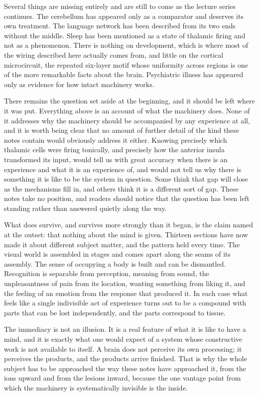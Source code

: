 \documentclass[11pt]{article}
\begin{document}
Several things are missing entirely and are still to come as the lecture series continues. The cerebellum has appeared only as a comparator and deserves its own treatment. The language network has been described from its two ends without the middle. Sleep has been mentioned as a state of thalamic firing and not as a phenomenon. There is nothing on development, which is where most of the wiring described here actually comes from, and little on the cortical microcircuit, the repeated six-layer motif whose uniformity across regions is one of the more remarkable facts about the brain. Psychiatric illness has appeared only as evidence for how intact machinery works.

There remains the question set aside at the beginning, and it should be left where it was put. Everything above is an account of what the machinery does. None of it addresses why the machinery should be accompanied by any experience at all, and it is worth being clear that no amount of further detail of the kind these notes contain would obviously address it either. Knowing precisely which thalamic cells were firing tonically, and precisely how the anterior insula transformed its input, would tell us with great accuracy when there is an experience and what it is an experience of, and would not tell us why there is something it is like to be the system in question. Some think that gap will close as the mechanisms fill in, and others think it is a different sort of gap. These notes take no position, and readers should notice that the question has been left standing rather than answered quietly along the way.

What does survive, and survives more strongly than it began, is the claim named at the outset: that nothing about the mind is given. Thirteen sections have now made it about different subject matter, and the pattern held every time. The visual world is assembled in stages and comes apart along the seams of its assembly. The sense of occupying a body is built and can be dismantled. Recognition is separable from perception, meaning from sound, the unpleasantness of pain from its location, wanting something from liking it, and the feeling of an emotion from the response that produced it. In each case what feels like a single indivisible act of experience turns out to be a compound with parts that can be lost independently, and the parts correspond to tissue.

The immediacy is not an illusion. It is a real feature of what it is like to have a mind, and it is exactly what one would expect of a system whose constructive work is not available to itself. A brain does not perceive its own processing; it perceives the products, and the products arrive finished. That is why the whole subject has to be approached the way these notes have approached it, from the ions upward and from the lesions inward, because the one vantage point from which the machinery is systematically invisible is the inside.
\end{document}
